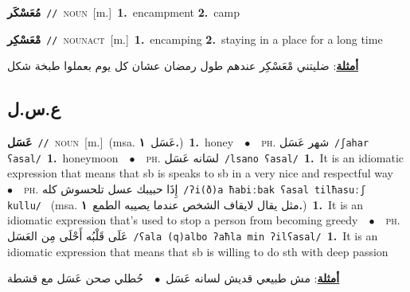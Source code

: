 \documentclass[10pt,a4paper,twoside]{article} %
\begin{document}
\begin{multicols}{2}
{\setlength\topsep{0pt}\textbf{\foreignlanguage{arabic}{مُعَسْكَر}}\ {\color{gray}\texttt{//}\color{black}}\ \textsc{noun}\ [m.]\ \textbf{1.}~encampment  \textbf{2.}~camp\ } \vspace{2mm}

{\setlength\topsep{0pt}\textbf{\foreignlanguage{arabic}{مْعَسْكِر}}\ {\color{gray}\texttt{//}\color{black}}\ \textsc{noun\textunderscore act}\ [m.]\ \textbf{1.}~encamping  \textbf{2.}~staying in a place for a long time\  \begin{flushright}\color{gray}\foreignlanguage{arabic}{\textbf{\underline{\foreignlanguage{arabic}{أمثلة}}}: ضليتني مْعَسْكِر عندهم طول رمضان عشان كل يوم بعملوا طبخة شكل}\end{flushright}\color{black}} \vspace{2mm}

\vspace{-3mm}
\subsection*{\color{blue}\foreignlanguage{arabic}{ع.س.ل}\color{blue}{}} 

{\setlength\topsep{0pt}\textbf{\foreignlanguage{arabic}{عَسَل}}\ {\color{gray}\texttt{//}\color{black}}\ \textsc{noun}\ [m.]\ \color{gray}(msa. \foreignlanguage{arabic}{عَسَل}~\foreignlanguage{arabic}{\textbf{١.}})\color{black}\ \textbf{1.}~honey\ \ $\bullet$\ \ \textsc{ph.} \color{gray} \foreignlanguage{arabic}{شهر عَسَل}\color{black}\ {\color{gray}\texttt{/{\sffamily ʃahar ʕasal}/}\color{black}}\ \textbf{1.}~honeymoon\ \ $\bullet$\ \ \textsc{ph.} \color{gray} \foreignlanguage{arabic}{لسَانه عَسَل}\color{black}\ {\color{gray}\texttt{/{\sffamily lsano ʕasal}/}\color{black}}\ \textbf{1.}~It is an idiomatic expression that means that sb is speaks to sb in a very nice and respectful way\ \ $\bullet$\ \ \textsc{ph.} \color{gray} \foreignlanguage{arabic}{إِذَا حبيبك عسل تلحسوش كله}\color{black}\ {\color{gray}\texttt{/{\sffamily ʔi(ð)a ħabiːbak ʕasal tilħasuːʃ kullu}/}\color{black}}\ \color{gray} (msa. \foreignlanguage{arabic}{مثل يقال لايقاف الشخص عندما يصيبه الطمع}~\foreignlanguage{arabic}{\textbf{١.}})\color{black}\ \textbf{1.}~It is an idiomatic expression that's used to stop a person from becoming greedy\ \ $\bullet$\ \ \textsc{ph.} \color{gray} \foreignlanguage{arabic}{عَلَى قَلْبُه أَحْلَى مِن العَسَل}\color{black}\ {\color{gray}\texttt{/{\sffamily ʕala (q)albo ʔaħla min ʔilʕasal}/}\color{black}}\ \textbf{1.}~It is an idiomatic expression that means that sb is willing to do sth with deep passion\  \begin{flushright}\color{gray}\foreignlanguage{arabic}{\textbf{\underline{\foreignlanguage{arabic}{أمثلة}}}: مش طبيعي قديش لسانه عَسَل\ $\bullet$\ \  حُطلي صحن عَسَل  مع قشطة}\end{flushright}\color{black}} \vspace{2mm}


\end{multicols}
\end{document}
